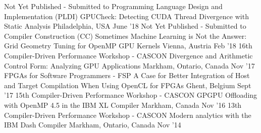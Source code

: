 \begin{cventries}
\publication
  {Not Yet Published - Submitted to Programming Language Design and Implementation (PLDI)}
  {GPUCheck: Detecting CUDA Thread Divergence with Static Analysis}
  {Philadelphia, USA}
  {June '18}
\publication
  {Not Yet Published - Submitted to Compiler Construction (CC)}
  {Sometimes Machine Learning is Not the Answer: Grid Geometry Tuning for OpenMP GPU Kernels}
  {Vienna, Austria}
  {Feb '18}
\presentation
  {16th Compiler-Driven Performance Workshop - CASCON}
  {Divergence and Arithmetic Control Form: Analyzing GPU Applications}
  {Markham, Ontario, Canada}
  {Nov '17}
\publication
  {FPGAs for Software Programmers - FSP}
  {A Case for Better Integration of Host and Target Compilation When Using OpenCL for FPGAs}
  {Ghent, Belgium}
  {Sept '17}
\presentation
  {15th Compiler-Driven Performance Workshop - CASCON}
  {GPGPU Offloading with OpenMP 4.5 in the IBM XL Compiler}
  {Markham, Canada}
  {Nov '16}
\presentation
  {13th Compiler-Driven Performance Workshop - CASCON}
  {Modern analytics with the IBM Dash Compiler}
  {Markham, Ontario, Canada}
  {Nov '14}
\end{cventries}
